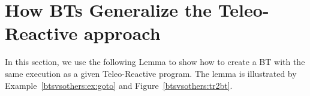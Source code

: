 %
%
%
%
%
% 



\section{How BTs Generalize the Teleo-Reactive approach}
\label{btsvsothers:sec:analogyTRs}
In this section, we use the following 
Lemma to show how to create a BT with the same execution as a given Teleo-Reactive program. The lemma is illustrated by Example~\ref{btsvsothers:ex:goto} and Figure~\ref{btsvsothers:tr2bt}.

